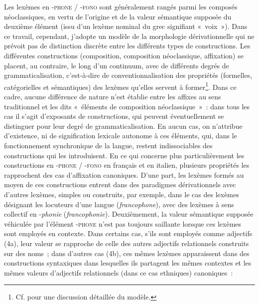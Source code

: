 \documentclass[output=paper]{langsci/langscibook}
\begin{document}
Les lexèmes en -\textsc{phone / -fono} sont généralement rangés parmi
les composés néoclassiques, en vertu de l'origine et de la valeur
sémantique supposée du deuxième élément (issu d'un lexème nominal du
grec signifiant «~voix~»). Dans ce travail, cependant, j'adopte un modèle
de la morphologie dérivationnelle qui ne prévoit pas de distinction
discrète entre les différents types de constructions. Les différentes
constructions (composition, composition néoclassique, affixation) se
placent, au contraire, le long d'un continuum, avec de différents degrés
de grammaticalisation, c'est-à-dire de conventionnalisation des
propriétés (formelles, catégorielles et sémantiques) des lexèmes
qu'elles servent à former\footnote{Cf. %
\citet{lasserre2014.cmlf}
 pour une discussion détaillée du modèle.}. Dans ce cadre, aucune
différence de nature n'est établie entre les affixes au sens
traditionnel et les dits «~éléments de composition néoclassique~»~: dans
tous les cas il s'agit d'exposants de constructions, qui peuvent
éventuellement se distinguer pour leur degré de grammaticalisation. En
aucun cas, on n'attribue d'existence, ni de signification lexicale
autonome %
\citep[\emph{contra}, par exemple,][]{Corbin2001} %
%
à ces éléments, qui,
dans le fonctionnement synchronique de la langue, restent indissociables
des constructions qui les introduisent. En ce qui concerne plus
particulièrement les constructions en -\textsc{phone / -fono} en
français et en italien, plusieurs propriétés les rapprochent des cas
d'affixation canoniques. D'une part, les lexèmes formés au moyen de ces
constructions entrent dans des paradigmes dérivationnels avec d'autres
lexèmes, simples ou construits, par exemple, dans le cas des lexèmes
désignant les locuteurs d'une langue (\emph{francophone}), avec des
lexèmes à sens collectif en -\emph{phonie} (\emph{francophonie}).
Deuxièmement, la valeur sémantique supposée véhiculée par l'élément
-\textsc{phone} n'est pas toujours saillante lorsque ces lexèmes sont
employés en contexte. Dans certains cas, s'ils sont employés comme
adjectifs (4a), leur valeur se rapproche de celle des autres adjectifs
relationnels construits sur des noms~; dans d'autres cas (4b), ces mêmes
lexèmes apparaissent dans des constructions syntaxiques dans lesquelles
ils partagent les mêmes contextes et les mêmes valeurs d'adjectifs
relationnels (dans ce cas ethniques) canoniques~:
\end{document}
